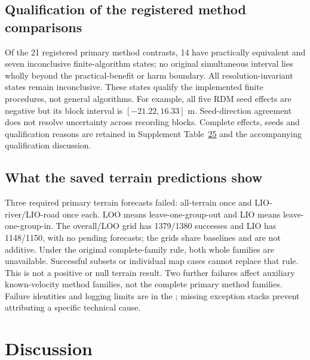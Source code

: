 \subsection{Qualification of the registered method comparisons}
Of the 21 registered primary method contrasts, 14 have practically
equivalent and seven inconclusive finite-algorithm states; no original
simultaneous interval lies wholly beyond the practical-benefit or harm
boundary. All resolution-invariant states remain inconclusive. These
states qualify the implemented finite procedures, not general algorithms.
For example, all five RDM seed effects are negative but its block interval
is $[-21.22,16.33]$ m. Seed-direction agreement does not resolve uncertainty
across recording blocks. Complete effects, seeds and qualification reasons
are retained in Supplement Table~\href{supplement.pdf\#tab:preliminary-method-effects}{25}
and the accompanying qualification discussion.

\subsection{What the saved terrain predictions show}\label{sec:terrain-results}\hypertarget{sec:terrain-results}{}


Three required primary terrain forecasts failed: all-terrain once and
LIO-river/LIO-road once each. LOO means leave-one-group-out and LIO means
leave-one-group-in. The overall/LOO grid has 1379/1380 successes
and LIO has 1148/1150, with no pending forecasts; the grids share baselines
and are not additive. Under the original complete-family rule, both whole
families are unavailable. Successful subsets or individual map cases cannot
replace that rule. This is not a positive or null terrain result. Two
further failures affect auxiliary known-velocity method families, not the
complete primary method families. Failure identities and logging limits
are in the ; missing exception stacks prevent
attributing a specific technical cause.

\FloatBarrier
\section{Discussion}\hypertarget{sec:discussion-score}{}
